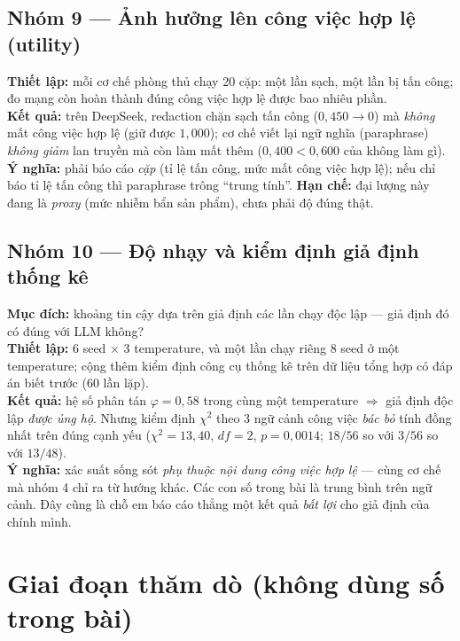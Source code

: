 \documentclass[11pt,a4paper]{article}
\newcommand{\nhan}[1]{\textbf{#1}}
\begin{document}
\subsection{Nhóm 9 --- Ảnh hưởng lên công việc hợp lệ (utility)}
\nhan{Thiết lập:} mỗi cơ chế phòng thủ chạy 20 cặp: một lần sạch, một lần bị tấn công; đo
mạng còn hoàn thành đúng công việc hợp lệ được bao nhiêu phần.\\
\nhan{Kết quả:} trên DeepSeek, redaction chặn sạch tấn công ($0{,}450 \to 0$) mà
\emph{không} mất công việc hợp lệ (giữ được $1{,}000$); cơ chế viết lại ngữ nghĩa
(paraphrase) \emph{không giảm} lan truyền mà còn làm mất thêm ($0{,}400 < 0{,}600$ của
không làm gì).\\
\nhan{Ý nghĩa:} phải báo cáo \emph{cặp} (tỉ lệ tấn công, mức mất công việc hợp lệ); nếu
chỉ báo tỉ lệ tấn công thì paraphrase trông ``trung tính''.
\nhan{Hạn chế:} đại lượng này đang là \emph{proxy} (mức nhiễm bẩn sản phẩm), chưa phải độ
đúng thật.

\subsection{Nhóm 10 --- Độ nhạy và kiểm định giả định thống kê}
\nhan{Mục đích:} khoảng tin cậy dựa trên giả định các lần chạy độc lập --- giả định đó có
đúng với LLM không?\\
\nhan{Thiết lập:} 6 seed $\times$ 3 temperature, và một lần chạy riêng 8 seed ở một
temperature; cộng thêm kiểm định công cụ thống kê trên dữ liệu tổng hợp có đáp án biết
trước (60 lần lặp).\\
\nhan{Kết quả:} hệ số phân tán $\varphi=0{,}58$ trong cùng một temperature $\Rightarrow$
giả định độc lập \emph{được ủng hộ}. Nhưng kiểm định $\chi^2$ theo 3 ngữ cảnh công việc
\emph{bác bỏ} tính đồng nhất trên đúng cạnh yếu ($\chi^2=13{,}40$, $df=2$, $p=0{,}0014$;
$18/56$ so với $3/56$ so với $13/48$).\\
\nhan{Ý nghĩa:} xác suất sống sót \emph{phụ thuộc nội dung công việc hợp lệ} --- cùng cơ
chế mà nhóm 4 chỉ ra từ hướng khác. Các con số trong bài là trung bình trên ngữ cảnh.
Đây cũng là chỗ em báo cáo thẳng một kết quả \emph{bất lợi} cho giả định của chính mình.

\section{Giai đoạn thăm dò (không dùng số trong bài)}
\end{document}
